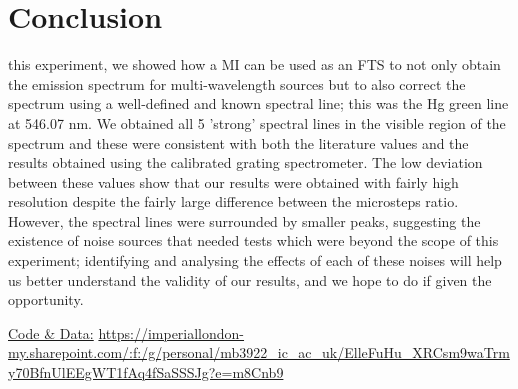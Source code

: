 \documentclass[journal]{Imperial_lab_report}
\begin{document}
\section{Conclusion}
 this experiment, we showed how a MI can be used as an FTS to not only obtain the emission spectrum for multi-wavelength sources but to also correct the spectrum using a well-defined and known spectral line; this was the Hg green line at 546.07 nm. We obtained all 5 'strong' spectral lines in the visible region of the spectrum and these were consistent with both the literature values and the results obtained using the calibrated grating spectrometer. The low deviation between these values show that our results were obtained with fairly high resolution despite the fairly large difference between the microsteps ratio. However, the spectral lines were surrounded by smaller peaks, suggesting the existence of noise sources that needed tests which were beyond the scope of this experiment; identifying and analysing the effects of each of these noises will help us better understand the validity of our results, and we hope to do if given the opportunity. 

\vspace{-7pt}
\appendix
\vspace{-5pt}
\noindent
\small{\href{https://imperiallondon-my.sharepoint.com/:f:/g/personal/mb3922_ic_ac_uk/ElleFuHu_XRCsm9waTrmy70BfnUlEEgWT1fAq4fSaSSSJg?e=m8Cnb9}{Code \& Data:} \url{https://imperiallondon-my.sharepoint.com/:f:/g/personal/mb3922_ic_ac_uk/ElleFuHu_XRCsm9waTrmy70BfnUlEEgWT1fAq4fSaSSSJg?e=m8Cnb9}}


 

\end{document}

